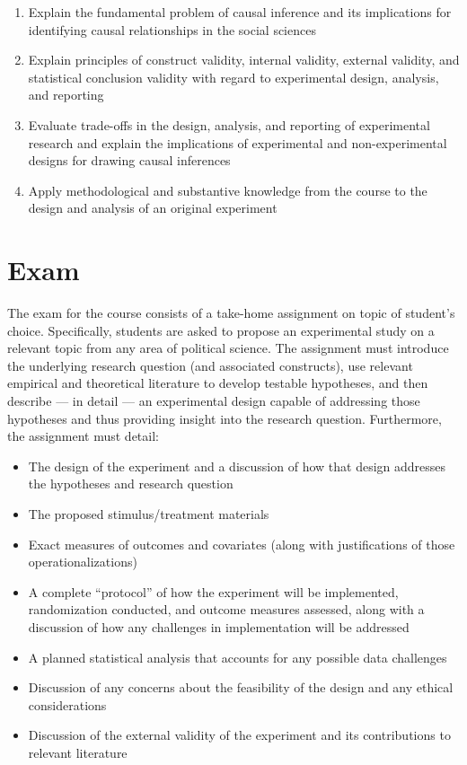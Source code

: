 \documentclass[12pt,a4paper]{article}
\begin{document}
\begin{enumerate}
\item Explain the fundamental problem of causal inference and its implications for identifying causal relationships in the social sciences
\item Explain principles of construct validity, internal validity, external validity, and statistical conclusion validity with regard to experimental design, analysis, and reporting
\item Evaluate trade-offs in the design, analysis, and reporting of experimental research and explain the implications of experimental and non-experimental designs for drawing causal inferences
\item Apply methodological and substantive knowledge from the course to the design and analysis of an original experiment
\end{enumerate}

\section{Exam}
The exam for the course consists of a take-home assignment on topic of student's choice. Specifically, students are asked to propose an experimental study on a relevant topic from any area of political science. The assignment must introduce the underlying research question (and associated constructs), use relevant empirical and theoretical literature to develop testable hypotheses, and then describe --- in detail --- an experimental design capable of addressing those hypotheses and thus providing insight into the research question. Furthermore, the assignment must detail:
\begin{itemize}
\item The design of the experiment and a discussion of how that design addresses the hypotheses and research question
\item The proposed stimulus/treatment materials
\item Exact measures of outcomes and covariates (along with justifications of those operationalizations)
\item A complete ``protocol'' of how the experiment will be implemented, randomization conducted, and outcome measures assessed, along with a discussion of how any challenges in implementation will be addressed
\item A planned statistical analysis that accounts for any possible data challenges
\item Discussion of any concerns about the feasibility of the design and any ethical considerations
\item Discussion of the external validity of the experiment and its contributions to relevant literature
\end{itemize}
\end{document}
